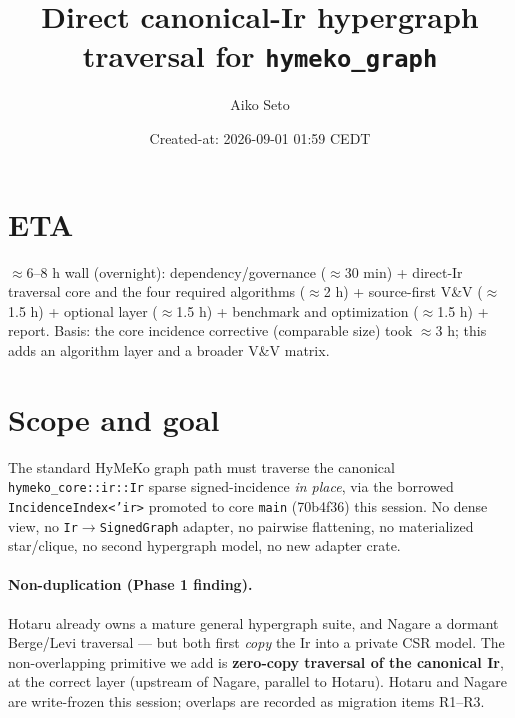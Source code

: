 \documentclass[11pt]{article}
\title{Direct canonical-Ir hypergraph traversal for \texttt{hymeko\_graph}}
\author{Aiko Seto}
\date{Created-at: 2026-09-01 01:59 CEDT}
\begin{document}
\maketitle

\section*{ETA}
$\approx$6--8 h wall (overnight): dependency/governance ($\approx$30 min) + direct-Ir traversal core and
the four required algorithms ($\approx$2 h) + source-first V\&V ($\approx$1.5 h) + optional layer
($\approx$1.5 h) + benchmark and optimization ($\approx$1.5 h) + report. Basis: the core incidence
corrective (comparable size) took $\approx$3 h; this adds an algorithm layer and a broader V\&V matrix.

\section{Scope and goal}
The standard HyMeKo graph path must traverse the canonical \texttt{hymeko\_core::ir::Ir} sparse
signed-incidence \emph{in place}, via the borrowed \texttt{IncidenceIndex<'ir>} promoted to core
\texttt{main} (70b4f36) this session. No dense view, no \texttt{Ir$\to$SignedGraph} adapter, no
pairwise flattening, no materialized star/clique, no second hypergraph model, no new adapter crate.

\paragraph{Non-duplication (Phase 1 finding).} Hotaru already owns a mature general hypergraph suite,
and Nagare a dormant Berge/Levi traversal --- but both first \emph{copy} the Ir into a private CSR
model. The non-overlapping primitive we add is \textbf{zero-copy traversal of the canonical Ir},
at the correct layer (upstream of Nagare, parallel to Hotaru). Hotaru and Nagare are write-frozen
this session; overlaps are recorded as migration items R1--R3.
\end{document}

